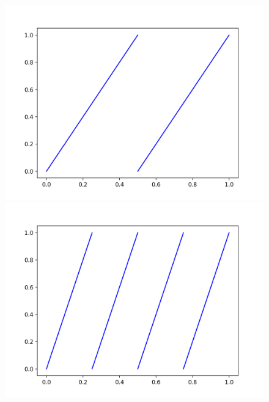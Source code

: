 \documentclass[12pt]{article}
\theoremstyle{plain}
\begin{document}
\begin{figure}[H]
\begin{minipage}[c][0.24\width]{0.24\textwidth}
   \centering
   \includegraphics[width=\textwidth]{figure/section3/mod2-ite1.png}
\end{minipage}
\begin{minipage}[c][0.24\width]{0.24\textwidth}
   \centering
   \includegraphics[width=\textwidth]{figure/section3/mod2-ite2.png}
\end{minipage}
\begin{minipage}[c][0.24\width]{0.24\textwidth}
   \centering

\end{minipage}
\end{figure}
\end{document}
